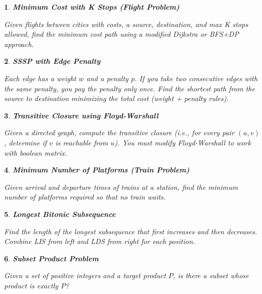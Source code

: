 \documentclass[%
addpoints]{exam}
\theoremstyle{problem}
\newtheorem{p}{}
\begin{document}

\begin{p}
\textbf{Minimum Cost with K Stops (Flight Problem)}

Given flights between cities with costs, a source, destination, and max K stops allowed, find the minimum cost path using a modified Dijkstra or BFS+DP approach.
\hfill \end{p}

\begin{p}
\textbf{SSSP with Edge Penalty}

Each edge has a weight $w$ and a penalty $p$. If you take two consecutive edges with the same penalty, you pay the penalty only once. Find the shortest path from the source to destination minimizing the total cost (weight + penalty rules).
\hfill \end{p}

\begin{p}
\textbf{Transitive Closure using Floyd-Warshall}

Given a directed graph, compute the transitive closure (i.e., for every pair $(u, v)$, determine if $v$ is reachable from $u$). You must modify Floyd-Warshall to work with boolean matrix.
\hfill \end{p}

\begin{p}
\textbf{Minimum Number of Platforms (Train Problem)}

Given arrival and departure times of trains at a station, find the minimum number of platforms required so that no train waits.
\hfill \end{p}

\begin{p}
\textbf{Longest Bitonic Subsequence}

Find the length of the longest subsequence that first increases and then decreases. Combine LIS from left and LDS from right for each position.
\hfill \end{p}

\begin{p}
\textbf{Subset Product Problem}

Given a set of positive integers and a target product $P$, is there a subset whose product is exactly $P$?
\hfill \end{p}

\end{document}
